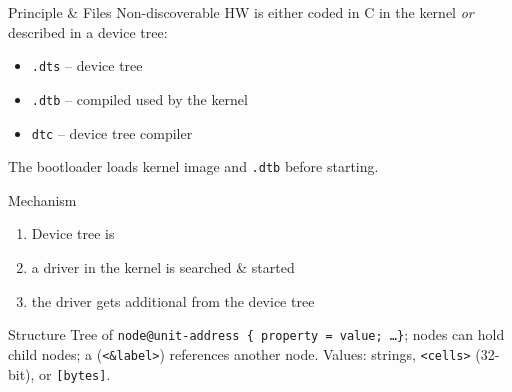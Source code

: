 
\begin{definition}{Principle \& Files}
    Non-discoverable HW is either coded in C in the kernel \emph{or} described in a
    device tree:
    \begin{itemize}
        \item \texttt{.dts} -- device tree 
        \item \texttt{.dtb} -- compiled  used by the kernel
        \item \texttt{dtc} -- device tree compiler
    \end{itemize}
    The bootloader loads  kernel image and \texttt{.dtb} before starting.
\end{definition}

\begin{definition}{Mechanism}
    \begin{enumerate}
        \item Device tree is 
        \item a  driver in the kernel is searched \& started
        \item the driver gets additional  from the device tree
    \end{enumerate}
\end{definition}

\multend

\begin{definition}{Structure}
    Tree of \texttt{node@unit-address \{ property = value; \dots \}}; nodes can hold
    child nodes; a  (\texttt{<\&label>}) references another node.
    Values: strings, \texttt{<cells>} (32-bit), or \texttt{[bytes]}.
\end{definition}

